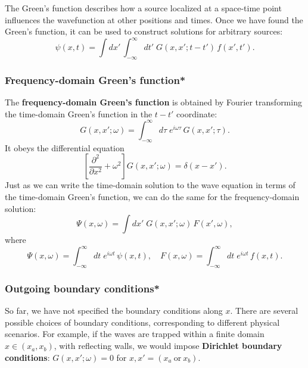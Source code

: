 \documentclass[10pt,a4paper]{article}
\begin{document}
The Green's function describes how a source localized at a space-time
point influences the wavefunction at other positions and times. Once we
have found the Green's function, it can be used to construct solutions
for arbitrary sources:
\begin{equation}
\psi(x,t) = \int dx' \,\int_{-\infty}^\infty dt'\; G(x,x';t-t') \, f(x', t').
\end{equation}

\subsubsection{Frequency-domain Green's function*}
\label{frequency-domain-greens-function}

The \textbf{frequency-domain Green's function} is obtained by Fourier
transforming the time-domain Green's function in the $t-t'$
coordinate:
\begin{equation}
G(x,x';\omega) = \int_{-\infty}^\infty d\tau\; e^{i\omega \tau}\, G(x,x'; \tau).
\end{equation}
It obeys the differential equation
\begin{equation}
\left[\frac{\partial^2}{\partial x^2} + \omega^2 \right] G(x,x';\omega) = \delta(x-x').
\end{equation}
Just as we can write the time-domain solution to the wave equation in
terms of the time-domain Green's function, we can do the same for the
frequency-domain solution:
\begin{equation}
\Psi(x,\omega) = \int dx' \; G(x,x';\omega) \, F(x', \omega),
\end{equation}
where
\begin{equation}
\Psi(x,\omega) = \int_{-\infty}^\infty dt \; e^{i\omega t} \, \psi(x,t), \quad F(x,\omega) = \int_{-\infty}^\infty dt \; e^{i\omega t} \, f(x,t).
\end{equation}

\subsubsection{Outgoing boundary conditions*}
\label{outgoing-boundary-conditions}

So far, we have not specified the boundary conditions along $x$.
There are several possible choices of boundary conditions,
corresponding to different physical scenarios.  For example, if the
waves are trapped within a finite domain $x \in (x_a,x_b)$, with
reflecting walls, we would impose \textbf{Dirichlet boundary
  conditions}: $G(x,x';\omega) = 0$ for $x,x' =
(x_a~\mathrm{or}~x_b)$.
\end{document}

